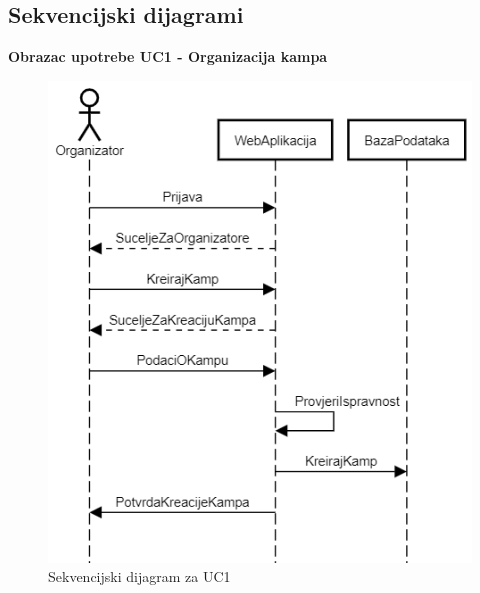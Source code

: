 \subsection{Sekvencijski dijagrami}\label{sec:sekvencijski-dijagrami}
\textbf{Obrazac upotrebe UC1 - Organizacija kampa}\\
\begin{figure}[H]
	\centering
	\includegraphics[scale=0.6]{dijagrami/UC1.PNG}
	\caption{Sekvencijski dijagram za UC1}
	\label{fig: uc1 sekv}
\end{figure}

